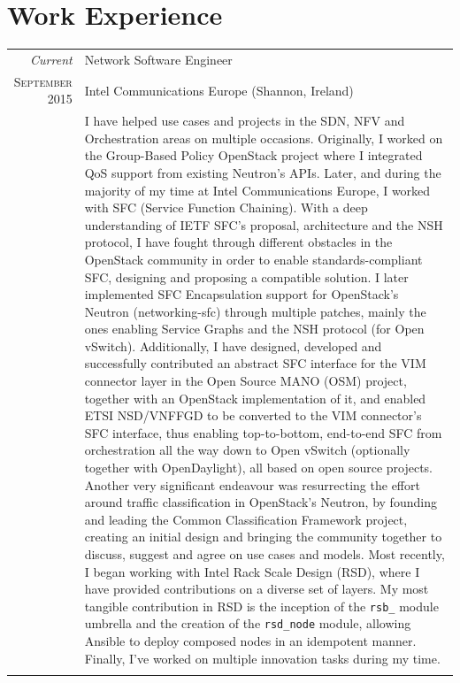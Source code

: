 \documentclass[letter,10pt]{article} %
\begin{document}
\section{Work Experience}
\label{section:work_experience}
\begin{tabular}{r|p{13.4cm}}

	\emph{Current} & Network Software Engineer \\
	\textsc{September 2015} & Intel Communications Europe (Shannon, Ireland) \\
	& \footnotesize{I have helped use cases and projects in the SDN, NFV and Orchestration areas on multiple occasions. Originally, I worked on the Group-Based Policy OpenStack project where I integrated QoS support from existing Neutron's APIs. Later, and during the majority of my time at Intel Communications Europe, I worked with SFC (Service Function Chaining). With a deep understanding of IETF SFC's proposal, architecture and the NSH protocol, I have fought through different obstacles in the OpenStack community in order to enable standards-compliant SFC, designing and proposing a compatible solution. I later implemented SFC Encapsulation support for OpenStack's Neutron (networking-sfc) through multiple patches, mainly the ones enabling Service Graphs and the NSH protocol (for Open vSwitch). Additionally, I have designed, developed and successfully contributed an abstract SFC interface for the VIM connector layer in the Open Source MANO (OSM) project, together with an OpenStack implementation of it, and enabled ETSI NSD/VNFFGD to be converted to the VIM connector's SFC interface, thus enabling top-to-bottom, end-to-end SFC from orchestration all the way down to Open vSwitch (optionally together with OpenDaylight), all based on open source projects. Another very significant endeavour was resurrecting the effort around traffic classification in OpenStack's Neutron, by founding and leading the Common Classification Framework project, creating an initial design and bringing the community together to discuss, suggest and agree on use cases and models. Most recently, I began working with Intel Rack Scale Design (RSD), where I have provided contributions on a diverse set of layers. My most tangible contribution in RSD is the inception of the \verb+rsb_+ module umbrella and the creation of the \verb+rsd_node+ module, allowing Ansible to deploy composed nodes in an idempotent manner. Finally, I've worked on multiple innovation tasks during my time.}\\
	\multicolumn{2}{c}{} \\


\end{tabular}
\end{document}
